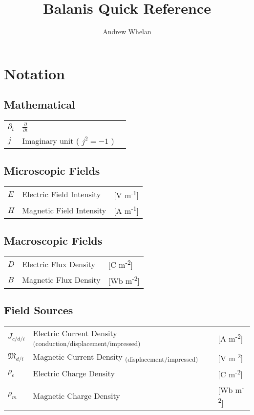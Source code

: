 \documentclass{article}
\title{Balanis Quick Reference}
\author{Andrew Whelan}
\date{}
\begin{document}
\maketitle
\thispagestyle{empty}
\setcounter{page}{0}

\tableofcontents

\newpage
\small
\section*{Notation}
\subsection*{Mathematical}
\begin{tabular}{ m{7em} m{24em} m{4em} }
    \( \partial_t \) & \( \displaystyle \frac{\partial}{\partial t}\) & \\
    \( j \) & Imaginary unit ( \( j^2 = -1 \) ) & \\
\end{tabular}
\subsection*{Microscopic Fields}
\begin{tabular}{ m{7em} m{24em} m{4em} }
    \( E \) & Electric Field Intensity & [V m\textsuperscript{-1}] \\
    \( H \) & Magnetic Field Intensity & [A m\textsuperscript{-1}] \\
\end{tabular}
\subsection*{Macroscopic Fields}
\begin{tabular}{ m{7em} m{24em} m{4em} }
    \( D \) & Electric Flux Density & [C m\textsuperscript{-2}] \\
    \( B \) & Magnetic Flux Density & [Wb m\textsuperscript{-2}] \\
\end{tabular}
\subsection*{Field Sources}
\begin{tabular}{ m{7em} m{24em} m{4em} }
    \( \displaystyle J_{c/d/i} \) & Electric Current Density \textsubscript{(conduction/displacement/impressed)} & [A m\textsuperscript{-2}] \\
    \( \displaystyle \mathfrak{M}_{d/i} \) & Magnetic Current Density \textsubscript{(displacement/impressed)} & [V m\textsuperscript{-2}] \\
    \( \displaystyle \rho_{e} \) & Electric Charge Density & [C m\textsuperscript{-2}] \\
    \( \displaystyle \rho_{m} \) & Magnetic Charge Density & [Wb m\textsuperscript{-2}] \\
\end{tabular}
\end{document}
